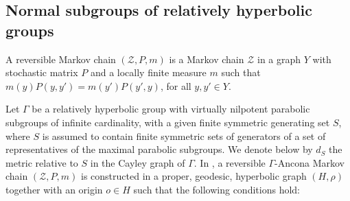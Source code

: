\documentclass[12pt,a4paper]{amsart}
\numberwithin{equation}{section}
\theoremstyle{definition}
\begin{document}
\subsection{Normal subgroups of relatively hyperbolic groups}\label{secrh}
A reversible Markov chain $(\mathcal{Z},P,m)$ is a Markov chain $\mathcal Z$ in a graph $Y$ with stochastic matrix $P$ and a locally finite measure $m$ such that $m(y)P(y,y')=m(y')P(y',y)$, for all $y,y'\in Y$.

Let $\Gamma$ be a relatively hyperbolic group with virtually nilpotent parabolic subgroups of infinite cardinality, with a given finite symmetric generating set $S$, where $S$ is assumed to contain finite symmetric sets of generators of a set of representatives of the maximal parabolic subgroups. We denote below by $d_S$ the metric relative to $S$ in the Cayley graph of $\Gamma$.
In \cite{Nan}, a reversible $\Gamma$-Ancona Markov chain $(\mathcal{Z},P,m)$ is constructed in a proper, geodesic, hyperbolic graph $(H,\rho)$ together with an origin $o\in H$ such that the following conditions hold:
\end{document}
